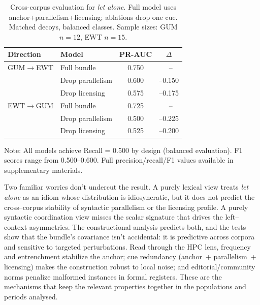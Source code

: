 \documentclass[12pt]{article}
\begin{document}
\begin{table}[t]
  \centering
  \caption{Cross-corpus evaluation for \textit{let alone}. Full model uses anchor+parallelism+licensing; ablations drop one cue. Matched decoys, balanced classes. Sample sizes: GUM $n{=}12$, EWT $n{=}15$.}
  \label{tab:letalone-eval}
  \begin{tabular}{llcc}
    \toprule
    Direction & Model & PR-AUC & $\Delta$ \\
    \midrule
    GUM$\to$EWT & Full bundle & 0.750 & ~--  \\
                & Drop parallelism & 0.600 & --0.150 \\
                & Drop licensing & 0.575 & --0.175 \\
    \addlinespace
    EWT$\to$GUM & Full bundle & 0.725 & ~--  \\
                & Drop parallelism & 0.500 & --0.225 \\
                & Drop licensing & 0.525 & --0.200 \\
    \bottomrule
  \end{tabular}
  
  \smallskip
  \footnotesize
  Note: All models achieve Recall = 0.500 by design (balanced evaluation). F1 scores range from 0.500--0.600. Full precision/recall/F1 values available in supplementary materials.
\end{table}


Two familiar worries don't undercut the result. A purely lexical view treats \emph{let alone} as an idiom whose distribution is idiosyncratic, but it does not predict the cross–corpus stability of syntactic parallelism or the licensing profile. A purely syntactic coordination view misses the scalar signature that drives the left–context asymmetries. The constructional analysis predicts both, and the tests show that the bundle’s covariance isn't accidental: it is predictive across corpora and sensitive to targeted perturbations. Read through the \textsc{HPC} lens, frequency and entrenchment stabilize the anchor; cue redundancy (anchor~+ parallelism~+ licensing) makes the construction robust to local noise; and editorial/community norms penalize malformed instances in formal registers. These are the mechanisms that keep the relevant properties together in the populations and periods analysed.
\end{document}
